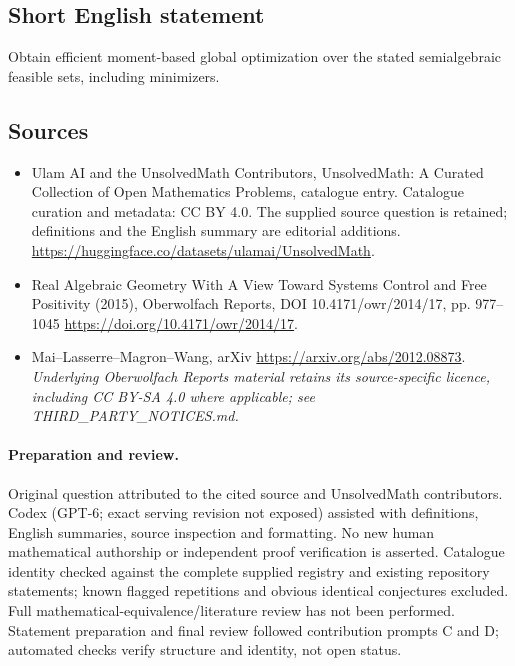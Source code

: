 \documentclass[11pt]{article}
\begin{document}
\subsection{Short English statement}
Obtain efficient moment-based global optimization over the stated semialgebraic feasible sets, including minimizers.
\subsection{Sources}
\begin{itemize}
\item[\hypertarget{source:statement:1}{S1}] Ulam AI and the UnsolvedMath Contributors, UnsolvedMath: A Curated Collection of Open Mathematics Problems, catalogue entry. Catalogue curation and metadata: CC BY 4.0. The supplied source question is retained; definitions and the English summary are editorial additions.
\url{https://huggingface.co/datasets/ulamai/UnsolvedMath}.
\item[\hypertarget{source:statement:2}{S2}] Real Algebraic Geometry With A View Toward Systems Control and Free Positivity (2015), Oberwolfach Reports, DOI 10.4171/owr/2014/17, pp. 977--1045
\url{https://doi.org/10.4171/owr/2014/17}.
\item[\hypertarget{source:statement:3}{S3}] Mai--Lasserre--Magron--Wang, arXiv
\url{https://arxiv.org/abs/2012.08873}.
\textit{Underlying Oberwolfach Reports material retains its source-specific licence, including CC BY-SA 4.0 where applicable; see THIRD\_PARTY\_NOTICES.md.}
\end{itemize}
\paragraph{Preparation and review.}
Original question attributed to the cited source and UnsolvedMath contributors. Codex (GPT-6; exact serving revision not exposed) assisted with definitions, English summaries, source inspection and formatting. No new human mathematical authorship or independent proof verification is asserted. Catalogue identity checked against the complete supplied registry and existing repository statements; known flagged repetitions and obvious identical conjectures excluded. Full mathematical-equivalence/literature review has not been performed. Statement preparation and final review followed contribution prompts C and D; automated checks verify structure and identity, not open status.
\label{end:statement}
\end{document}
